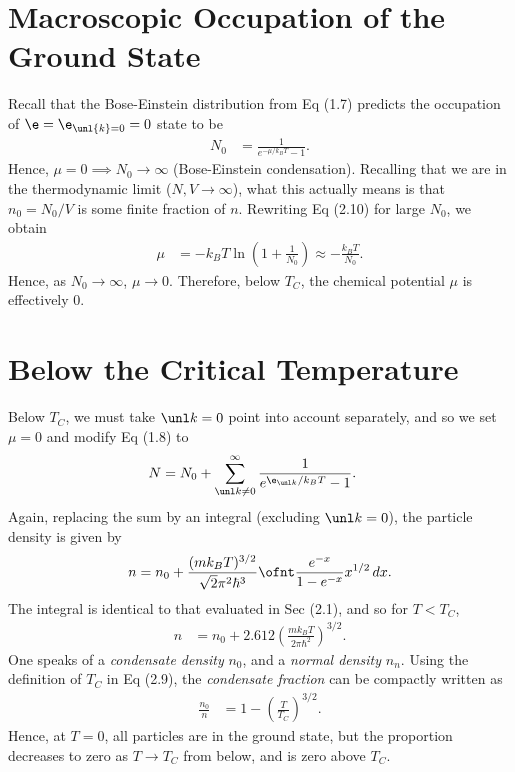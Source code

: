 \documentclass[qo.tex]{subfiles}
\begin{document}
\section{Macroscopic Occupation of the Ground State}
Recall that the Bose-Einstein distribution from Eq (1.7) predicts the occupation of $\e=\e_{\unl{k}=0}=0$ state to be 
\begin{align}
    N_0 &= \frac{1}{e^{-\mu/k_BT}-1}.
\end{align}
Hence, $\mu=0\implies N_0\to\infty$ (Bose-Einstein condensation).
Recalling that we are in the thermodynamic limit ($N,V\to\infty$), what this actually means is that $n_0=N_0/V$ is some finite fraction of $n$.
Rewriting Eq (2.10) for large $N_0$, we obtain 
\begin{align}
    \mu &= -k_BT\ln\left(1+\frac{1}{N_0}\right) \approx -\frac{k_BT}{N_0}.
\end{align}
Hence, as $N_0\to\infty$, $\mu\to0$.
Therefore, below $T_C$, the chemical potential $\mu$ is effectively 0.

\section{Below the Critical Temperature}
Below $T_C$, we must take $\vk=0$ point into account separately, and so we set $\mu=0$ and modify Eq (1.8) to
\begin{align}
    N &= N_0 + \sum_{\vk\neq0}^\infty \frac{1}{e^{\e_{\vk}/k_BT}-1}.
\end{align}
Again, replacing the sum by an integral (excluding $\vk=0$), the particle density is given by 
\begin{align}
    n = n_0 + \frac{(mk_BT)^{3/2}}{\sqrt{2}\pi^2\hbar^3}\ofnt \frac{e^{-x}}{1-e^{-x}}x^{1/2}\,dx.
\end{align}
The integral is identical to that evaluated in Sec (2.1), and so for $T<T_C$, 
\begin{align}
    n &= n_0 + 2.612\left(\frac{mk_BT}{2\pi\hbar^2}\right)^{3/2}.
\end{align}
One speaks of a \emph{condensate density} $n_0$, and a \emph{normal density} $n_n$.
Using the definition of $T_C$ in Eq (2.9), the \emph{condensate fraction} can be compactly written as
\begin{align}
    \frac{n_0}{n} &= 1-\left(\frac{T}{T_C}\right)^{3/2}.
\end{align}
Hence, at $T=0$, all particles are in the ground state, but the proportion decreases to zero as $T\to T_C$ from below, and is zero above $T_C$.
\end{document}
